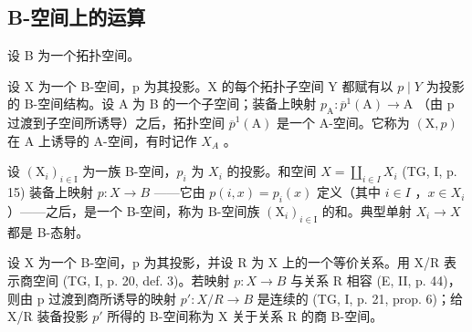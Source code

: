 \subsection{B-空间上的运算}

设 B 为一个拓扑空间。

设 X 为一个 B-空间，p 为其投影。X 的每个拓扑子空间 Y 都赋有以 \(p \mid Y\) 为投影的 B-空间结构。设 A 为 B 的一个子空间；装备上映射 \(p_{\mathrm{A}}: \overline{p}^{1}(\mathrm{A}) \to \mathrm{A}\) （由 p 过渡到子空间所诱导）之后，拓扑空间 \(\overline{p}^{1}(\mathrm{A})\) 是一个 A-空间。它称为 \((\mathrm{X}, p)\) 在 A 上诱导的 A-空间，有时记作 \(X_{A}\) 。

设 \((\mathrm{X}_{i})_{i\in\mathrm{I}}\) 为一族 B-空间，\(p_{i}\) 为 \(X_{i}\) 的投影。和空间 \(X = \coprod_{i\in I} X_{i}\) (TG, I, p. 15) 装备上映射 \(p: X \to B\) ——它由 \(p(i,x) = p_{i}(x)\) 定义（其中 \(i \in I\) ，\(x \in X_{i}\) ）——之后，是一个 B-空间，称为 B-空间族 \((\mathrm{X}_{i})_{i\in\mathrm{I}}\) 的和。典型单射 \(X_{i} \to X\) 都是 B-态射。

设 X 为一个 B-空间，p 为其投影，并设 R 为 X 上的一个等价关系。用 X/R 表示商空间 (TG, I, p. 20, def. 3)。若映射 \(p: X \rightarrow B\) 与关系 R 相容 (E, II, p. 44)，则由 p 过渡到商所诱导的映射 \(p'\colon X/R \to B\) 是连续的 (TG, I, p. 21, prop. 6)；给 X/R 装备投影 \(p'\) 所得的 B-空间称为 X 关于关系 R 的商 B-空间。

